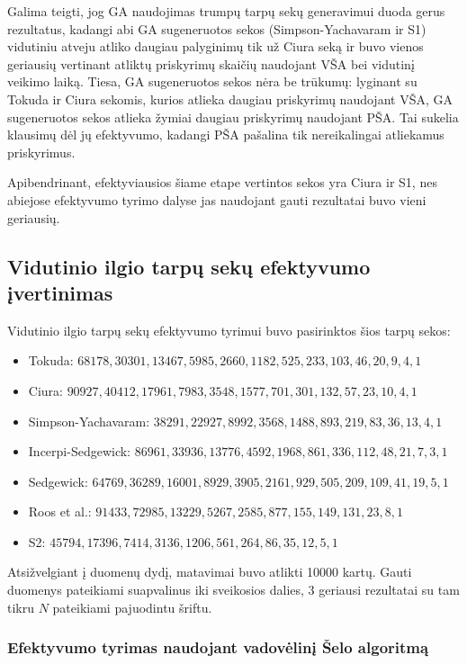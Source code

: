 \documentclass{VUMIFInfKursinis}
\begin{document}
Galima teigti, jog GA naudojimas trumpų tarpų sekų generavimui duoda gerus rezultatus, kadangi abi GA sugeneruotos sekos (Simpson-Yachavaram ir S1)
vidutiniu atveju atliko daugiau palyginimų tik už Ciura seką ir buvo vienos geriausių vertinant atliktų priskyrimų skaičių naudojant VŠA bei vidutinį veikimo laiką.
Tiesa, GA sugeneruotos sekos nėra be trūkumų: lyginant su Tokuda ir Ciura sekomis, kurios atlieka daugiau priskyrimų naudojant VŠA, GA sugeneruotos sekos atlieka žymiai daugiau priskyrimų
naudojant PŠA. Tai sukelia klausimų dėl jų efektyvumo, kadangi PŠA pašalina tik nereikalingai atliekamus priskyrimus.

Apibendrinant, efektyviausios šiame etape vertintos sekos yra Ciura ir S1,
nes abiejose efektyvumo tyrimo dalyse jas naudojant gauti rezultatai buvo vieni geriausių.


\subsection{Vidutinio ilgio tarpų sekų efektyvumo įvertinimas}

Vidutinio ilgio tarpų sekų efektyvumo tyrimui buvo pasirinktos šios tarpų sekos:
\begin{itemize}
  \item Tokuda: $68178,30301,13467,5985,2660,1182,525,233,103,46,20,9,4,1$ \cite{10.5555/645569.659879}
  \item Ciura: $90927,40412,17961,7983,3548,1577,701,301,132,57,23,10,4,1$ \cite{ciura2001best}
  \item Simpson-Yachavaram: $38291,22927,8992,3568,1488,893,219,83,36,13,4,1$ \cite{simpson1999faster}
  \item Incerpi-Sedgewick: $86961,33936,13776,4592,1968,861,336,112,48,21,7,3,1$ \cite{incerpi1985improved}
  \item Sedgewick: $64769,36289,16001,8929,3905,2161,929,505,209,109,41,19,5,1$ \cite{SEDGEWICK1986159}
  \item Roos et al.: $91433,72985,13229,5267,2585,877,155,149,131,23,8,1$ \cite{roos2002genetic}
  \item S2: $45794,17396,7414,3136,1206,561,264,86,35,12,5,1$
\end{itemize}

Atsižvelgiant į duomenų dydį, matavimai buvo atlikti 10000 kartų.
Gauti duomenys pateikiami suapvalinus iki sveikosios dalies,
3 geriausi rezultatai su tam tikru $N$ pateikiami pajuodintu šriftu.

\subsubsection{Efektyvumo tyrimas naudojant vadovėlinį Šelo algoritmą}
\end{document}
